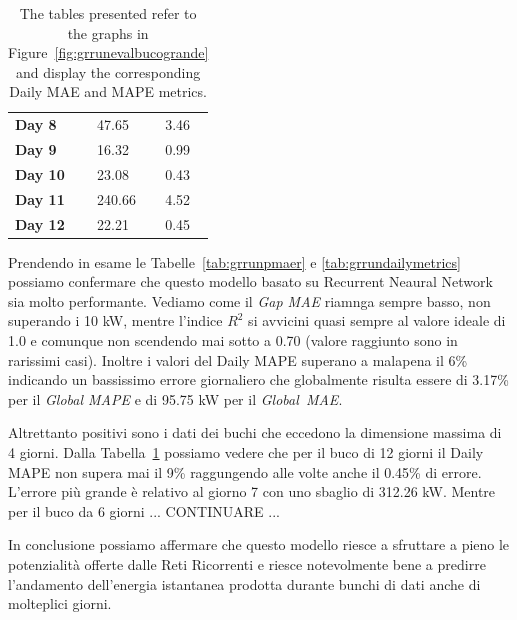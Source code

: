 \begin{table}[H]
\begin{minipage}[t]{.45\textwidth}
\begin{center}
\begin{tabular}[c]{l|l|l}
				\textbf{Day 8}  & 47.65                                  & 3.46 \\
				\textbf{Day 9}  & 16.32                                  & 0.99 \\
				\textbf{Day 10} & 23.08                                  & 0.43 \\
				\textbf{Day 11} & 240.66                                 & 4.52 \\
				\textbf{Day 12} & 22.21                                  & 0.45
			\end{tabular}
		\end{center}
	\end{minipage}
	\caption{The tables presented refer to the graphs in Figure~\ref{fig:grrunevalbucogrande} and display the corresponding Daily MAE and MAPE metrics.}\label{tab:grrunbuchigrandi}
\end{table}

Prendendo in esame le Tabelle~\ref{tab:grrunpmaer} e \ref{tab:grrundailymetrics} possiamo confermare che questo modello basato
su Recurrent Neaural Network sia molto performante. Vediamo come
il \textit{Gap MAE} riamnga sempre basso, non superando i 10 kW, mentre
l'indice $R^2$ si avvicini quasi sempre al valore ideale di 1.0\cite{metrics} e comunque non scendendo mai sotto a 0.70 (valore raggiunto sono in rarissimi casi).
Inoltre i valori del Daily MAPE superano a malapena il 6\% indicando un
bassissimo errore giornaliero che globalmente risulta essere di 3.17\% per
il \textit{Global MAPE} e di 95.75 kW per il \textit{Global~MAE}.

Altrettanto positivi sono i dati dei buchi che eccedono la dimensione massima di 4 giorni. Dalla Tabella~\ref{tab:grrunbuchigrandi}
possiamo vedere che per il buco di 12 giorni il Daily MAPE non supera mai
il 9\% raggungendo alle volte anche il 0.45\% di errore. L'errore più grande
è relativo al giorno 7 con uno sbaglio di 312.26 kW.
Mentre per il buco da 6 giorni ... CONTINUARE ...

In conclusione possiamo affermare che questo modello riesce a sfruttare a pieno
le potenzialità offerte dalle Reti Ricorrenti e riesce notevolmente bene
a predirre l'andamento dell'energia istantanea prodotta durante bunchi di
dati anche di molteplici giorni.